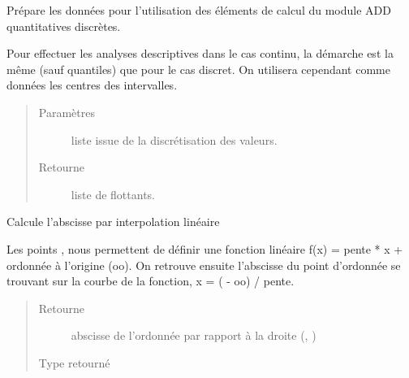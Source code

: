 \documentclass[letterpaper,10pt,openany,oneside,french]{sphinxmanual}
\begin{document}

\begin{fulllineitems}
\label{\detokenize{addQuantitativesContinues:add.addQuantitativesContinues.preparationIntervallesAnalyse}}
Prépare les données pour l’utilisation des éléments de calcul du module ADD quantitatives discrètes.

Pour effectuer les analyses descriptives dans le cas continu, la démarche est la même (sauf quantiles) que pour le cas discret.
On utilisera cependant comme données les centres des intervalles.
\begin{quote}\begin{description}
\item[{Paramètres}] \leavevmode
{} \textendash{} liste issue de la discrétisation des valeurs.

\item[{Retourne}] \leavevmode
liste de flottants.

\end{description}\end{quote}

\end{fulllineitems}


\begin{fulllineitems}
\label{\detokenize{addQuantitativesContinues:add.addQuantitativesContinues.interpolationLineaire}}
Calcule l’abscisse par interpolation linéaire

Les points ,  nous permettent de définir une fonction linéaire f(x) = pente * x + ordonnée à l’origine (oo).
On retrouve ensuite l’abscisse du point d’ordonnée  se trouvant sur la courbe de la fonction, x = ( - oo) / pente.
\begin{quote}\begin{description}
\item[{Retourne}] \leavevmode
abscisse de l’ordonnée  par rapport à la droite (, )

\item[{Type retourné}] \leavevmode
{}

\end{description}\end{quote}

\end{fulllineitems}
\end{document}
